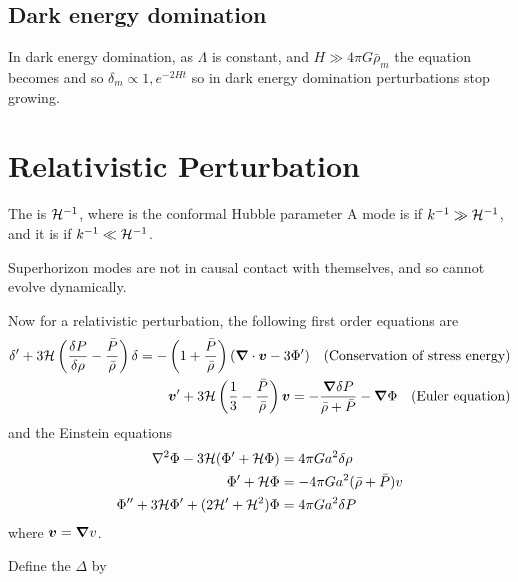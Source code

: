 \documentclass{article}
\begin{document}
\subsection{Dark energy domination}
In dark energy domination, as $\Lambda$ is constant, and $H\gg 4\pi G\bar{\rho}_m$ the equation becomes 
and so $\delta_m \propto 1, e^{-2Ht}$ so in dark energy domination perturbations stop growing. 

\section{Relativistic Perturbation}

\begin{definition}
The  is $\mathcal{H}^{-1}$, where
is the conformal Hubble parameter
A mode is  if $k^{-1}\gg \mathcal{H}^{-1}$, and it is  if $k^{-1}\ll \mathcal{H}^{-1}$.
\end{definition}

\begin{fact}
Superhorizon modes are not in causal contact with themselves, and so cannot evolve dynamically. 
\end{fact}

Now for a relativistic perturbation, the following first order equations are 
\begin{align}\label{eq:CSM:9}
\delta^\prime + 3\mathcal{H} \left( \frac{\delta P}{\delta \rho} - \frac{\bar{P}}{\bar{\rho}} \right) \delta = - \left( 1 + \frac{\bar{P}}{\bar{\rho}}\right) (\bm{\nabla} \cdot \bm{v} - 3\Phi^\prime) \quad \text{(Conservation of stress energy)} \\
\bm{v}^\prime + 3\mathcal{H} \left(\frac{1}{3} - \frac{\bar{P}}{\bar{\rho}} \right) \bm{v} = -\frac{\bm{\nabla} \delta P}{\bar{\rho}+\bar{P}} - \bm{\nabla}\Phi \quad \text{(Euler equation)} \\
\end{align}
and the Einstein equations 
\begin{align} \label{eq:CSM:2}
\nabla^2 \Phi - 3\mathcal{H}(\Phi^\prime + \mathcal{H}\Phi)  &= 4\pi G a^2 \delta \rho \\
\Phi^\prime + \mathcal{H}\Phi &= -4\pi G a^2 (\bar{\rho} + \bar{P}) v \\
\Phi^{\prime\prime} + 3 \mathcal{H} \Phi^\prime + (2\mathcal{H}^\prime + \mathcal{H}^2 ) \Phi &= 4\pi G a^2 \delta P 
\end{align}
where $\bm{v} = \bm{\nabla} v$.
\begin{definition}
Define the  $\Delta$ by
\end{definition}
\end{document}
